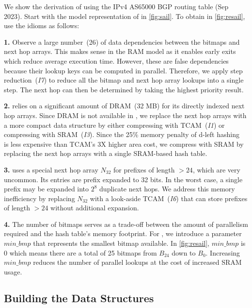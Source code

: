 We show the \cram derivation of \resail using the IPv4 AS65000 BGP routing table (Sep 2023). Start with the \cram model representation of \sail in \cref{fig:sail}. To obtain \resail in \cref{fig:resail}, use the idioms as follows:

{\bf 1.} Observe a large number~(26) of data dependencies between the bitmaps and next hop arrays. This makes sense in the RAM model as it enables early exits which reduce average execution time. However, these are false dependencies because their lookup keys can be computed in parallel. Therefore, we apply step reduction~({\em I7}) to reduce all the bitmap and next hop array lookups into a single step. The next hop can then be determined by taking the highest priority result.

{\bf 2.} \sail relies on a significant amount of DRAM~(32 MB) for its directly indexed next hop arrays. Since DRAM is not available in \cram, we replace the next hop arrays with a more compact data structure by either compressing with TCAM~({\em I1}) or compressing with SRAM~({\em I3}). Since the 25\% memory penalty of d-left hashing~\cite{dleft} is less expensive than TCAM's 3X higher area cost, we compress with SRAM by replacing the next hop arrays with a single SRAM-based hash table.

{\bf 3.} \sail uses a special next hop array $N_{32}$ for prefixes of length $>24$, which are very uncommon. Its entries are prefix expanded to 32 bits. In the worst case, a single prefix may be expanded into $2^{8}$ duplicate next hops. We address this memory inefficiency by replacing $N_{32}$ with a look-aside TCAM~({\em I6}) that can store prefixes of length $>24$ without additional expansion.

{\bf 4.} The number of bitmaps serves as a trade-off between the amount of parallelism required and the hash table's memory footprint. For \resail, we introduce a parameter $min\_bmp$ that represents the smallest bitmap available. In \cref{fig:resail}, $min\_bmp$ is 0 which means there are a total of 25 bitmaps from $B_{24}$ down to $B_0$. Increasing $min\_bmp$ reduces the number of parallel lookups at the cost of increased SRAM usage.

\subsection{Building the Data Structures} \label{subsec:building_resail}

